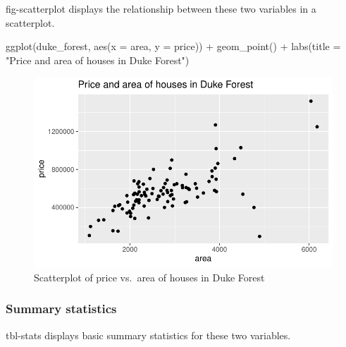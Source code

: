 \documentclass[
  letterpaper,
  DIV=11,
  numbers=noendperiod,
  oneside]{scrartcl}
\newenvironment{Shaded}{}{}
\newcommand{\AttributeTok}[1]{\textcolor[rgb]{0.49,0.56,0.16}{#1}}
\newcommand{\FunctionTok}[1]{\textcolor[rgb]{0.02,0.16,0.49}{#1}}
\newcommand{\NormalTok}[1]{#1}
\newcommand{\SpecialCharTok}[1]{\textcolor[rgb]{0.25,0.44,0.63}{#1}}
\newcommand{\StringTok}[1]{\textcolor[rgb]{0.25,0.44,0.63}{#1}}
\begin{document}
fig-scatterplot displays the relationship between these two variables in
a scatterplot.

\begin{Shaded}
\begin{Highlighting}[]
\FunctionTok{ggplot}\NormalTok{(duke\_forest, }\FunctionTok{aes}\NormalTok{(}\AttributeTok{x =}\NormalTok{ area, }\AttributeTok{y =}\NormalTok{ price)) }\SpecialCharTok{+}
  \FunctionTok{geom\_point}\NormalTok{() }\SpecialCharTok{+}
  \FunctionTok{labs}\NormalTok{(}\AttributeTok{title =} \StringTok{"Price and area of houses in Duke Forest"}\NormalTok{)}
\end{Highlighting}
\end{Shaded}

\begin{figure}[H]

{\centering \includegraphics{authoring-complete_files/figure-pdf/fig-scatterplot-1.pdf}

}

\caption{\label{fig-scatterplot}Scatterplot of price vs.~area of houses
in Duke Forest}

\end{figure}

\hypertarget{summary-statistics}{%
\subsubsection{Summary statistics}\label{summary-statistics}}

tbl-stats displays basic summary statistics for these two variables.
\end{document}
